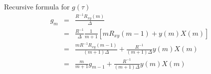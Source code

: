 \begin{frame}{Recursive formula for $g(\tau)$}
\begin{eqnarray*}
g_m &=& \frac{R^{-1}R_{xy}(m)}{\Delta} \\
&=& \frac{R^{-1}}{\Delta}\frac{1}{m+1}\left[mR_{xy}(m-1)+y(m)X(m)\right] \\
&=& \frac{mR^{-1}R_{xy}(m-1)}{(m+1)\Delta}+\frac{R^{-1}}{(m+1)\Delta}y(m)X(m) \\
&=& \frac{m}{m+1}g_{m-1}+\frac{R^{-1}}{(m+1)\Delta}y(m)X(m) %
\end{eqnarray*}
\end{frame}

%    
%    
